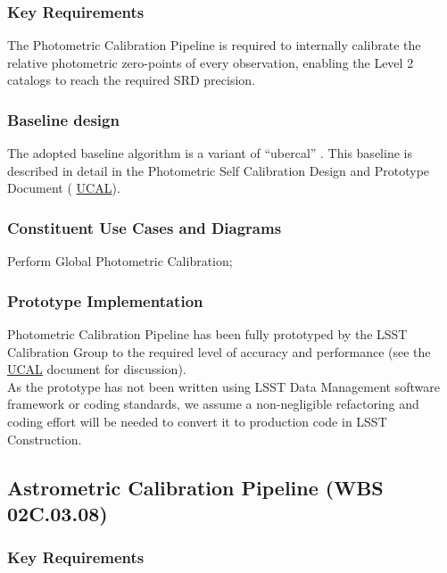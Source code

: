 \documentclass[12pt]{article}
\newcommand{\ds}[2]{{\color{blue} \href{https://docushare.lsstcorp.org/docushare/dsweb/Get/#1}{#2}}\xspace}
\newcommand{\UCAL}{\ds{Document-15125}{UCAL}}
\newcommand{\wbsAstroCal}{WBS 02C.03.08}
\begin{document}
\subsubsection{Key Requirements}

The Photometric Calibration Pipeline is required to internally calibrate the relative photometric zero-points of every observation, enabling the Level 2 catalogs to reach the required SRD precision.

\subsubsection{Baseline design}

The adopted baseline algorithm is a variant of ``ubercal'' \cite{Padmanabhan08, Schlafly12}. This baseline is described in detail in the Photometric Self Calibration Design and Prototype Document (\UCAL).

\subsubsection{Constituent Use Cases and Diagrams}

Perform Global Photometric Calibration;

\subsubsection{Prototype Implementation}

Photometric Calibration Pipeline has been fully prototyped by the LSST Calibration Group to the required level of accuracy and performance (see the \UCAL document for discussion). %
\\

As the prototype has not been written using LSST Data Management software framework or coding standards, we assume a non-negligible refactoring and coding effort will be needed to convert it to production code in LSST Construction.

\clearpage

\subsection{Astrometric Calibration Pipeline (\wbsAstroCal)}

\subsubsection{Key Requirements}
\end{document}
